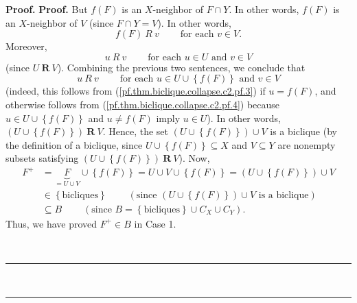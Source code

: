 \documentclass[numbers=enddot,12pt,final,onecolumn,notitlepage]{scrartcl}%
\theoremstyle{definition}
\newenvironment{proof}[1][Proof]{\noindent\textbf{#1.} }{\ \rule{0.5em}{0.5em}}
\newenvironment{verlong}{}{}
\begin{document}
\begin{proof}
\begin{proof}
\begin{verlong}
But $f\left(  F\right)  $ is an $X$-neighbor of $F\cap Y$. In other words,
$f\left(  F\right)  $ is an $X$-neighbor of $V$ (since $F\cap Y=V$). In other
words,%
\begin{equation}
f\left(  F\right)  \ R\ v\ \ \ \ \ \ \ \ \ \ \text{for each }v\in V.
\label{pf.thm.biclique.collapse.c2.pf.3}%
\end{equation}
Moreover,%
\begin{equation}
u\ R\ v\ \ \ \ \ \ \ \ \ \ \text{for each }u\in U\text{ and }v\in V
\label{pf.thm.biclique.collapse.c2.pf.4}%
\end{equation}
(since $U\ \mathbf{R}\ V$). Combining the previous two sentences, we conclude
that
\[
u\ R\ v\ \ \ \ \ \ \ \ \ \ \text{for each }u\in U\cup\left\{  f\left(
F\right)  \right\}  \text{ and }v\in V
\]
(indeed, this follows from (\ref{pf.thm.biclique.collapse.c2.pf.3}) if
$u=f\left(  F\right)  $, and otherwise follows from
(\ref{pf.thm.biclique.collapse.c2.pf.4}) because $u\in U\cup\left\{  f\left(
F\right)  \right\}  $ and $u\neq f\left(  F\right)  $ imply $u\in U$). In
other words, $\left(  U\cup\left\{  f\left(  F\right)  \right\}  \right)
\ \mathbf{R}\ V$. Hence, the set $\left(  U\cup\left\{  f\left(  F\right)
\right\}  \right)  \cup V$ is a biclique (by the definition of a biclique,
since $U\cup\left\{  f\left(  F\right)  \right\}  \subseteq X$ and $V\subseteq
Y$ are nonempty subsets satisfying $\left(  U\cup\left\{  f\left(  F\right)
\right\}  \right)  \ \mathbf{R}\ V$). Now,
\begin{align*}
F^{+}  &  =\underbrace{F}_{=U\cup V}\cup\left\{  f\left(  F\right)  \right\}
=U\cup V\cup\left\{  f\left(  F\right)  \right\}  =\left(  U\cup\left\{
f\left(  F\right)  \right\}  \right)  \cup V\\
&  \in\left\{  \text{bicliques}\right\}  \ \ \ \ \ \ \ \ \ \ \left(
\text{since }\left(  U\cup\left\{  f\left(  F\right)  \right\}  \right)  \cup
V\text{ is a biclique}\right) \\
&  \subseteq B\ \ \ \ \ \ \ \ \ \ \left(  \text{since }B=\left\{
\text{bicliques}\right\}  \cup C_{X}\cup C_{Y}\right)  .
\end{align*}
Thus, we have proved $F^{+}\in B$ in Case 1.
\end{verlong}


\end{proof}
\end{proof}
\end{document}
